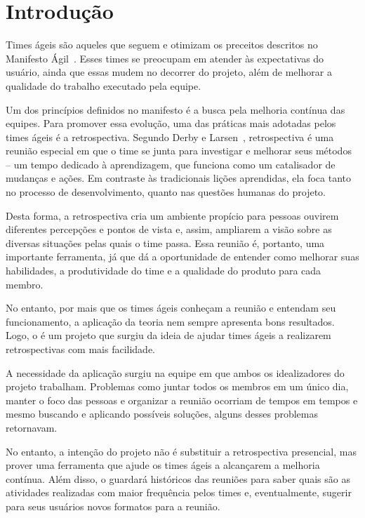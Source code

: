 \section{Introdução}
Times ágeis são aqueles que seguem e otimizam os preceitos descritos no Manifesto Ágil~\cite{manifesto}. Esses times se preocupam em atender às expectativas do usuário, ainda que essas mudem no decorrer do projeto, além de melhorar a qualidade do trabalho executado pela equipe.

Um dos princípios definidos no manifesto é a busca pela melhoria contínua das equipes. Para promover essa evolução, uma das práticas mais adotadas pelos times ágeis é a retrospectiva. Segundo Derby e Larsen~\cite{retrospectives}, retrospectiva é uma reunião especial em que o time se junta para investigar e melhorar seus métodos -- um tempo dedicado à aprendizagem, que funciona como um catalisador de mudanças e ações. Em contraste às tradicionais lições aprendidas, ela foca tanto no processo de desenvolvimento, quanto nas questões humanas do projeto.

Desta forma, a retrospectiva cria um ambiente propício para pessoas ouvirem diferentes percepções e pontos de vista e, assim, ampliarem a visão sobre as diversas situações pelas quais o time passa. Essa reunião é, portanto, uma importante ferramenta, já que dá a oportunidade de entender como melhorar suas habilidades, a produtividade do time e a qualidade do produto para cada membro.

No entanto, por mais que os times ágeis conheçam a reunião e entendam seu funcionamento, a aplicação da teoria nem sempre apresenta bons resultados. Logo, o \suricato{} é um projeto que surgiu da ideia de ajudar times ágeis a realizarem retrospectivas com mais facilidade.

A necessidade da aplicação surgiu na equipe em que ambos os idealizadores do projeto trabalham. Problemas como juntar todos os membros em um único dia, manter o foco das pessoas e organizar a reunião ocorriam de tempos em tempos e mesmo buscando e aplicando possíveis soluções, alguns desses problemas retornavam.

No entanto, a intenção do projeto não é substituir a retrospectiva presencial, mas prover uma ferramenta que ajude os times ágeis a alcançarem a melhoria contínua. Além disso, o \suricato{} guardará históricos das reuniões para saber quais são as atividades realizadas com maior frequência pelos times e, eventualmente, sugerir para seus usuários novos formatos para a reunião.